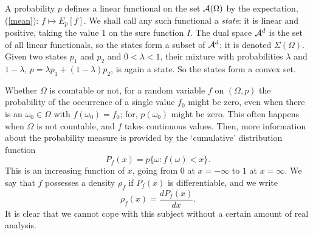 A probability $p$ defines a linear functional on the set ${\cal A}(\Omega)$
by the expectation, (\ref{mean}): $f\mapsto E_p[f]$.
We shall call any such functional a {\em state}: it is linear and positive,
taking the value $1$ on the sure function $I$.
The dual space ${\cal A}^d$ is the set of all linear functionals, so the
states form a subset of ${\cal A}^d$; it is denoted $\Sigma(\Omega)$.
Given two states $p_1$ and $p_2$ and $0<\lambda<1$, their mixture
with probabilities $\lambda$ and $1-\lambda$, $p=\lambda p_1+(1-
\lambda)p_2$, is again a state. So the states form a convex set.

Whether $\Omega$ is countable or not, for a random variable $f$ on
$(\Omega,p)$
the probability of the occurrence of a single value $f_0$ might be zero,
even when there is an $\omega_0\in\Omega$ with $f(\omega_0)=f_0$;
for, $p(\omega_0)$ might be zero. This often happens when $\Omega$ is
not countable, and $f$ takes continuous values. Then, more information
about the probability measure is provided by the `cumulative'
distribution function
\begin{equation}
P_f(x)=p\{\omega:f(\omega)<x\}.
\end{equation}
This is an increasing function of $x$, going from $0$ at $x=-\infty$ to $1$
at $x=\infty$.
We say that $f$ possesses a density $\rho_f$ if $P_f(x)$ is
differentiable, and we write
\begin{equation}
\rho_f(x)=\frac{dP_f(x)}{dx}.
\end{equation}
It is clear that we cannot cope with this subject without a certain
amount of real analysis.

